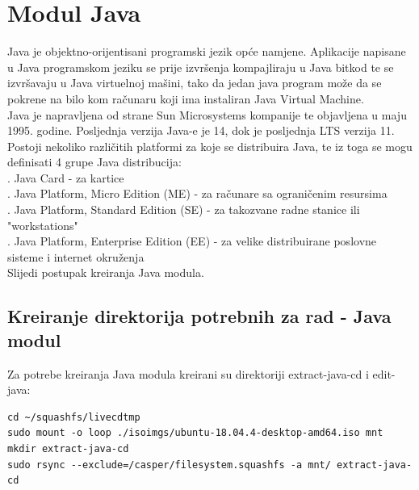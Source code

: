 \documentclass[12pt,vi]{mitthesis}
\begin{document}
\section*{Modul Java}
Java je objektno-orijentisani programski jezik opće namjene. Aplikacije napisane u Java programskom jeziku se prije izvršenja kompajliraju u Java bitkod te se izvršavaju u Java virtuelnoj mašini, tako da jedan java program može da se pokrene na bilo kom računaru koji ima instaliran Java Virtual Machine.\\
Java je napravljena od strane Sun Microsystems kompanije te objavljena u maju 1995. godine. Posljednja verzija Java-e je 14, dok je posljednja LTS verzija 11. Postoji nekoliko različitih platformi za koje se distribuira Java, te iz toga se mogu definisati 4 grupe Java distribucija:\\
. Java Card - za kartice\\
. Java Platform, Micro Edition (ME) - za računare sa ograničenim resursima\\
. Java Platform, Standard Edition (SE) - za takozvane radne stanice ili "workstations"\\
. Java Platform, Enterprise Edition (EE) - za velike distribuirane poslovne sisteme i internet okruženja\\
\indent
Slijedi postupak kreiranja Java modula.

\subsection*{Kreiranje direktorija potrebnih za rad - Java modul}
\indent
Za potrebe kreiranja Java modula kreirani su direktoriji extract-java-cd i edit-java:
\begin{lstlisting}[style=BashInputStyle]
cd ~/squashfs/livecdtmp
sudo mount -o loop ./isoimgs/ubuntu-18.04.4-desktop-amd64.iso mnt
mkdir extract-java-cd
sudo rsync --exclude=/casper/filesystem.squashfs -a mnt/ extract-java-cd
\end{lstlisting}
\end{document}
